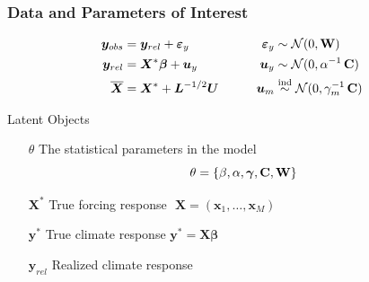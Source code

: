 \documentclass{beamer}
\newcommand{\C}{\ensuremath{\text{Cov}}}
\def\*#1{\bm{#1}}
\def\C{\textbf{\text{C}}}
\def\W{\textbf{\text{W}}}
\begin{document}
\begin{frame}
\frametitle{Data and Parameters of Interest}

\begin{block}{}
\vspace*{-\baselineskip}\setlength\belowdisplayshortskip{0pt}
\begin{alignat*}{3}
\*y_{obs} &= \*y_{rel} + \*\varepsilon_y  \qquad \quad &\*\varepsilon_y &\sim \mathcal N(0,\W)\\
\*y_{rel} &= \*X^* \*\beta + \*u_y \nonumber  \qquad  &\*u_y &\sim \mathcal N(0,\alpha^{-1}\,\C) \\
\overline{\*X} &= \*X^* + \*L^{-1/2} \*U \qquad    &\*u_m &\stackrel{\text{ind}}{\sim} \mathcal N(0,\gamma_m^{-1} \, \C)  \:
\end{alignat*}
\end{block}


\alert{Latent Objects}

\begin{itemize}
\item[$\theta$] The statistical parameters in the model
\[
\theta = \{\beta, \alpha, \*\gamma, \C, \W\}
\]
\item[$\*X^*$] True forcing response $\,\,\*X = (\*x_1, \dots, \*x_M)$
\item[$\*y^*$] True climate response $\*y^* = \*X \* \beta$
\item[$\*y_{rel}$] Realized climate response
\end{itemize}

\end{frame}
\end{document}
